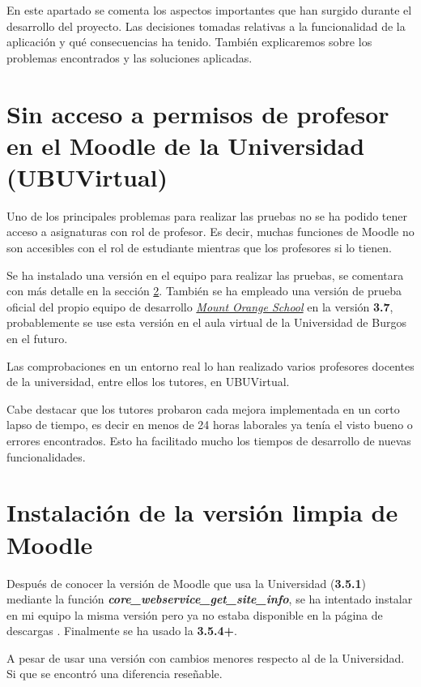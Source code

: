 
En este apartado se comenta los aspectos importantes que han surgido durante el desarrollo del proyecto. Las decisiones tomadas relativas a la funcionalidad de la aplicación y qué consecuencias ha tenido. También explicaremos sobre los problemas encontrados y las soluciones aplicadas.

\section{Sin acceso a permisos de profesor en el Moodle de la Universidad (UBUVirtual)}

Uno de los principales problemas para realizar las pruebas no se ha podido tener acceso a asignaturas con rol de profesor. Es decir, muchas funciones de Moodle no son accesibles con el rol de estudiante mientras que los profesores si lo tienen.


Se ha instalado una versión en el equipo para realizar las pruebas, se comentara con más detalle en la sección \ref{sec:instalacionMoodle}. También se ha empleado una versión de prueba oficial del propio equipo de desarrollo \href{https://school.demo.moodle.net}{\textit{Mount Orange School}} en la versión \textbf{3.7}, probablemente se use esta versión en el aula virtual de la Universidad de Burgos en el futuro.

Las comprobaciones en un entorno real lo han realizado varios profesores docentes de la universidad, entre ellos los tutores, en UBUVirtual. 

Cabe destacar que los tutores probaron cada mejora implementada en un corto lapso de tiempo, es decir en menos de 24 horas laborales ya tenía el visto bueno o errores encontrados. Esto ha facilitado mucho los tiempos de desarrollo de nuevas funcionalidades.

\section{Instalación de la versión limpia de Moodle} \label{sec:instalacionMoodle}
Después de conocer la versión de Moodle que usa la Universidad (\textbf{3.5.1}) mediante  la función \textbf{\textit{core\_webservice\_get\_site\_info}}, se ha intentado instalar en mi equipo la misma versión pero ya no estaba disponible en la página de descargas \cite{noauthor_moodle_nodate}. Finalmente se ha usado la \textbf{3.5.4+}.

A pesar de usar una versión con cambios menores respecto al de la Universidad. Si que se encontró una diferencia reseñable. 

